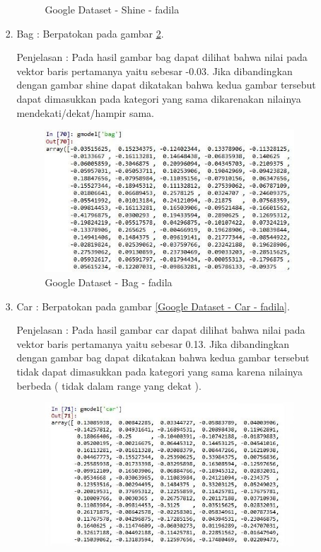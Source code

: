 \begin{enumerate}
\begin{enumerate}
\begin{enumerate}
\begin{figure}[!hbtp]
\caption{Google Dataset - Shine - fadila}
\label{Google Dataset - Shine - fadila}
\end{figure}
\par
\item Bag :  Berpatokan pada gambar \ref{Google Dataset - Bag - fadila}.
\par Penjelasan : Pada hasil gambar bag dapat dilihat bahwa nilai pada vektor baris pertamanya yaitu sebesar -0.03. Jika dibandingkan dengan gambar shine dapat dikatakan bahwa kedua gambar tersebut dapat dimasukkan pada kategori yang sama dikarenakan nilainya mendekati/dekat/hampir sama.
\par
\begin{figure}[!hbtp]
\centering
\includegraphics[scale=0.3]{figures/1-bag-fadila.jpg}
\caption{Google Dataset - Bag - fadila}
\label{Google Dataset - Bag - fadila}
\end{figure}
\par
\item Car :  Berpatokan pada gambar \ref{Google Dataset - Car - fadila}.
\par Penjelasan : Pada hasil gambar car dapat dilihat bahwa nilai pada vektor baris pertamanya yaitu sebesar 0.13. Jika dibandingkan dengan gambar bag dapat dikatakan bahwa kedua gambar tersebut tidak dapat dimasukkan pada kategori yang sama karena nilainya berbeda ( tidak dalam range yang dekat ).
\par
\begin{figure}[!hbtp]
\centering
\includegraphics[scale=0.3]{figures/1-car-fadila.jpg}

\end{figure}
\end{enumerate}
\end{enumerate}
\end{enumerate}
